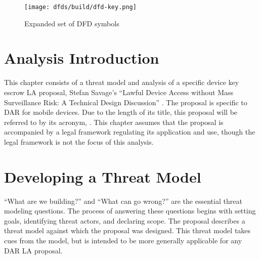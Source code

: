 \documentclass[manuscript,screen,review]{acmart}
\newcommand{\mysec}[1]{Section~\ref{#1}}
\begin{document}

\begin{figure}[t]
    \centering
    \texttt{[image: dfds/build/dfd-key.png]}
    \caption{Expanded set of DFD symbols}
    \label{fig-dfd-key}
\end{figure}


\section{Analysis Introduction}
\label{sec-intro}


This chapter consists of a threat model and analysis of a specific device key escrow \ac{LA} proposal, Stefan Savage's
``Lawful Device Access without Mass Surveillance Risk: A Technical Design Discussion'' \cite{savage_lawful_2018}. The
proposal is specific to \acl{DAR} for mobile devices. Due to the length of its title, this proposal will be referred to
by its acronym, \ldawmsR. This chapter assumes that the proposal is accompanied by a legal framework regulating its
application and use, though the legal framework is not the focus of this analysis.



\section{Developing a Threat Model}

``What are we building?'' and ``What can go wrong?'' are the essential threat modeling questions. The process of
answering these questions begins with setting goals, identifying threat actors, and declaring scope. The \ldawmsr
proposal describes a threat model against which the proposal was designed. This threat model takes cues from the
\ldawmsr model, but is intended to be more generally applicable for any \ac{DAR} \ac{LA} proposal.

\newcommand{\modelstart}[0]{\begin{itemize}}
\newcommand{\modelitem}[2]{ %
    \item \textbf{#1} \nopagebreak

    \vspace{0.5\baselineskip} \parbox{\linewidth}{#2} \vspace{0.5\baselineskip}
}
\newcommand{\modelend}{\end{itemize}}
\end{document}
